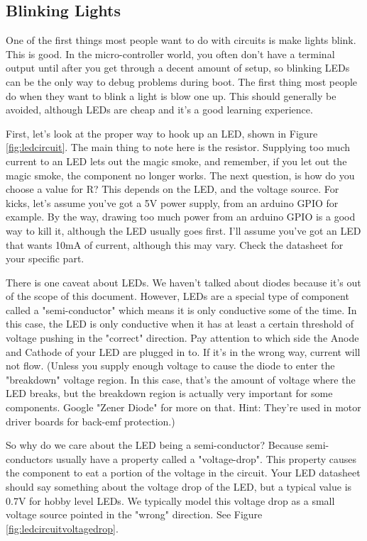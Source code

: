 \subsection{Blinking Lights}

One of the first things most people want to do with circuits is make lights blink. This is good. In the micro-controller world, you often don't have a terminal output until after you get through a decent amount of setup, so blinking LEDs can be the only way to debug problems during boot. The first thing most people do when they want to blink a light is blow one up. This should generally be avoided, although LEDs are cheap and it's a good learning experience.

First, let's look at the proper way to hook up an LED, shown in Figure \ref{fig:ledcircuit}. The main thing to note here is the resistor. Supplying too much current to an LED lets out the magic smoke, and remember, if you let out the magic smoke, the component no longer works. The next question, is how do you choose a value for R? This depends on the LED, and the voltage source. For kicks, let's assume you've got a 5V power supply, from an arduino GPIO for example. By the way, drawing too much power from an arduino GPIO is a good way to kill it, although the LED usually goes first. I'll assume you've got an LED that wants 10mA of current, although this may vary. Check the datasheet for your specific part.

There is one caveat about LEDs. We haven't talked about diodes because it's out of the scope of this document. However, LEDs are a special type of component called a "semi-conductor" which means it is only conductive some of the time. In this case, the LED is only conductive when it has at least a certain threshold of voltage pushing in the "correct" direction. Pay attention to which side the Anode and Cathode of your LED are plugged in to. If it's in the wrong way, current will not flow. (Unless you supply enough voltage to cause the diode to enter the "breakdown" voltage region. In this case, that's the amount of voltage where the LED breaks, but the breakdown region is actually very important for some components. Google "Zener Diode" for more on that. Hint: They're used in motor driver boards for back-emf protection.)

So why do we care about the LED being a semi-conductor? Because semi-conductors usually have a property called a "voltage-drop". This property causes the component to eat a portion of the voltage in the circuit. Your LED datasheet should say something about the voltage drop of the LED, but a typical value is 0.7V for hobby level LEDs. We typically model this voltage drop as a small voltage source pointed in the "wrong" direction. See Figure \ref{fig:ledcircuitvoltagedrop}.

